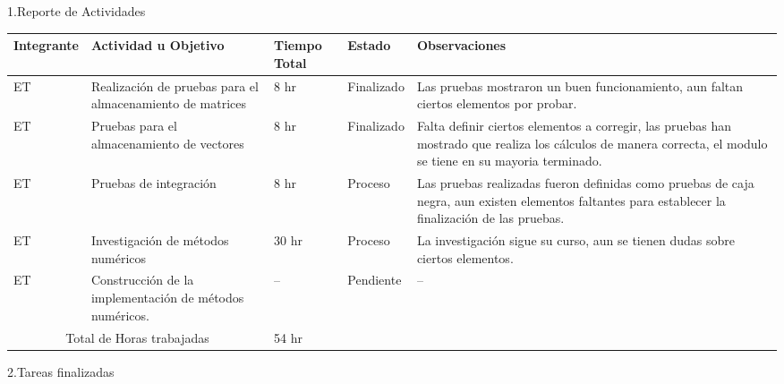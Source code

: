 \documentclass[12pt]{report}
\numberwithin{equation}{section}
\begin{document}
\begin{flushleft}

\large{1.Reporte de Actividades }\\


\begin{table}[H]
\begin{tabular}{|m{2cm}|m{4.5cm}|m{1.5cm}|m{1.5cm}|m{4.5cm}|}
\hline
\small{\textbf{Integrante}} &\small{ \textbf{Actividad u Objetivo}} &\small{ \textbf{Tiempo Total}} & \small{\textbf{Estado} }& \small{\textbf{Observaciones}}\\
\hline \hline
ET & Realizaci\'on de pruebas para el almacenamiento de matrices  & 8 hr & Finalizado & \small{Las pruebas mostraron un buen funcionamiento, aun faltan ciertos elementos por probar.}\\
\hline
ET & Pruebas para el almacenamiento de vectores  & 8 hr & Finalizado & \small{Falta definir ciertos elementos a corregir, las pruebas han mostrado que realiza los c\'alculos de manera correcta, el modulo se tiene en su mayoria terminado.}\\
\hline
ET & Pruebas de integraci\'on  & 8 hr & Proceso & \small{Las pruebas realizadas fueron definidas como pruebas de caja negra, aun existen elementos faltantes para establecer la finalizaci\'on de las pruebas.}\\
\hline
ET & Investigaci\'on de métodos num\'ericos  & 30 hr & Proceso & \small{La investigaci\'on sigue su curso, aun se tienen dudas sobre ciertos elementos.}\\
\hline
ET & Construcci\'on de la implementaci\'on de métodos num\'ericos.  & -- & Pendiente & --\\
\hline
\multicolumn{2}{|c|}{Total de Horas trabajadas} & 54 hr  & & \\
\hline 
\end{tabular}
\label{tabla: TABLA CE Actividades}
\end{table}



\large{2.Tareas finalizadas }\\


\end{flushleft}
\end{document}

